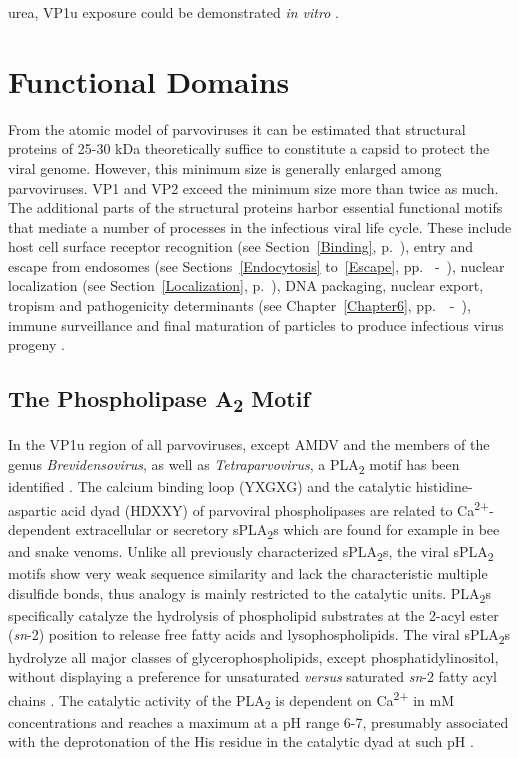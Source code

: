 urea, VP1u exposure could be demonstrated \textit{in vitro} \cite{pmid9927584, pmid15194745}. 
    
\section{Functional Domains}
\label{Motif}

From the atomic model of parvoviruses it can be estimated that structural proteins of 25-30 kDa theoretically suffice to constitute a capsid to protect the viral genome. However, this minimum size is generally enlarged among parvoviruses. VP1 and VP2 exceed the minimum size more than twice as much. The additional parts of the structural proteins harbor essential functional motifs that mediate a number of processes in the infectious viral life cycle. These include host cell surface receptor recognition (see Section~\ref{Binding}, p.~\pageref{Binding}), entry and escape from endosomes (see Sections~\ref{Endocytosis} to~\ref{Escape}, pp.~\pageref{Endocytosis} -~\pageref{Escape}), nuclear localization (see Section~\ref{Localization}, p.~\pageref{Localization}), DNA packaging, nuclear export, tropism and pathogenicity determinants (see Chapter~\ref{Chapter6}, pp.~\pageref{Chapter6}~-~\pageref{Chaper6end}), immune surveillance and final maturation of particles to produce infectious virus progeny \cite{PLA2}.    

\subsection{The Phospholipase A\textsubscript{2} Motif}
\label{PLA2}

In the VP1u region of all parvoviruses, except AMDV and the members of the genus \textit{Brevidensovirus}, as well as \textit{Tetraparvovirus}, a PLA\textsubscript{2} motif has been identified \cite{pmid11702787}. The calcium binding loop (YXGXG) and the catalytic histidine-aspartic acid dyad (HDXXY) of parvoviral phospholipases are related to Ca\textsuperscript{2+}-dependent extracellular or secretory sPLA\textsubscript{2}s which are found for example in bee and snake venoms. Unlike all previously characterized sPLA\textsubscript{2}s, the viral sPLA\textsubscript{2} motifs show very weak sequence similarity and lack the characteristic multiple disulfide bonds, thus analogy is mainly restricted to the catalytic units. PLA\textsubscript{2}s specifically catalyze the hydrolysis of phospholipid substrates at the 2-acyl ester (\textit{sn}-2) position to release free fatty acids and lysophospholipids. The viral sPLA\textsubscript{2}s hydrolyze all major classes of glycerophospholipids, except phosphatidylinositol, without displaying a preference for unsaturated \textit{versus} saturated \textit{sn}-2 fatty acyl chains \cite{pmid14726513}. The catalytic activity of the PLA\textsubscript{2} is dependent on Ca\textsuperscript{2+} in mM concentrations and reaches a maximum at a pH range 6-7, presumably associated with the deprotonation of the His residue in the catalytic dyad at such pH \cite{pmid9115999, pmid7574497}.

